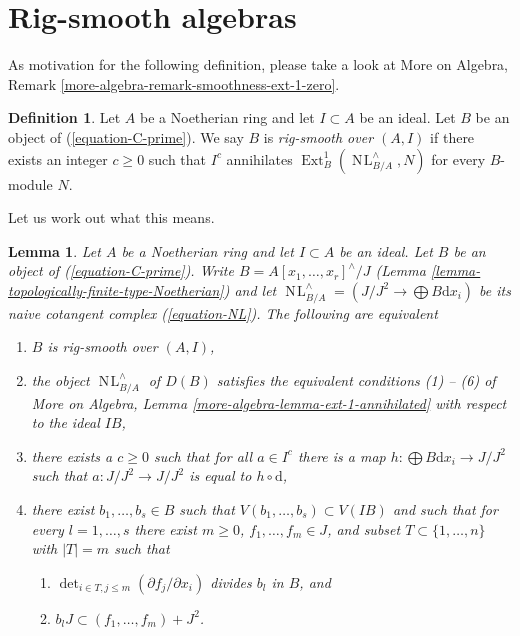 \documentclass{stacks-project}
\theoremstyle{plain}
\newtheorem{lemma}[subsection]{Lemma}
\theoremstyle{definition}
\newtheorem{definition}[subsection]{Definition}
\theoremstyle{remark}
\numberwithin{equation}{subsection}
\def\Ext{\mathop{\mathrm{Ext}}\nolimits}
\def\NL{\mathop{N\!L}\nolimits}
\begin{document}
\section{Rig-smooth algebras}
\label{section-rig-smooth}

\noindent
As motivation for the following definition, please take a look at
More on Algebra, Remark \ref{more-algebra-remark-smoothness-ext-1-zero}.

\begin{definition}
\label{definition-rig-smooth-homomorphism}
Let $A$ be a Noetherian ring and let $I \subset A$ be an ideal.
Let $B$ be an object of (\ref{equation-C-prime}). We say
$B$ is {\it rig-smooth over $(A, I)$} if there exists an integer $c \geq 0$
such that $I^c$ annihilates $\Ext^1_B(\NL_{B/A}^\wedge, N)$ for every
$B$-module $N$.
\end{definition}

\noindent
Let us work out what this means.

\begin{lemma}
\label{lemma-equivalent-with-artin-smooth}
Let $A$ be a Noetherian ring and let $I \subset A$ be an ideal.
Let $B$ be an object of (\ref{equation-C-prime}). Write
$B = A[x_1, \ldots, x_r]^\wedge/J$
(Lemma \ref{lemma-topologically-finite-type-Noetherian})
and let $\NL_{B/A}^\wedge = (J/J^2 \to \bigoplus B\text{d}x_i)$
be its naive cotangent complex (\ref{equation-NL}).
The following are equivalent
\begin{enumerate}
\item $B$ is rig-smooth over $(A, I)$,
\item the object $\NL_{B/A}^\wedge$ of $D(B)$ satisfies the equivalent
conditions (1) -- (6) of More on Algebra, Lemma
\ref{more-algebra-lemma-ext-1-annihilated} with respect to the ideal $IB$,
\item there exists a $c \geq 0$ such that for all $a \in I^c$
there is a map $h : \bigoplus B\text{d}x_i \to J/J^2$ such that
$a : J/J^2 \to J/J^2$ is equal to $h \circ \text{d}$,
\item there exist $b_1, \ldots, b_s \in B$ such that
$V(b_1, \ldots, b_s) \subset V(IB)$ and such that for every
$l = 1, \ldots, s$ there exist $m \geq 0$, $f_1, \ldots, f_m \in J$,
and subset $T \subset \{1, \ldots, n\}$ with $|T| = m$ such that
\begin{enumerate}
\item $\det_{i \in T, j \leq m}(\partial f_j/ \partial x_i)$
divides $b_l$ in $B$, and
\item $b_l J \subset (f_1, \ldots, f_m) + J^2$.
\end{enumerate}
\end{enumerate}
\end{lemma}
\end{document}
